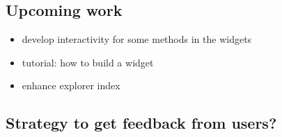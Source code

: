 \documentclass{deliverablereport}
\begin{document}
\subsection{Upcoming work}

\begin{itemize}
\item develop interactivity for some methods in the widgets
\item tutorial: how to build a widget
\item enhance explorer index
\end{itemize}

\subsection{Strategy to get feedback from users?}


\appendix

\end{document}
